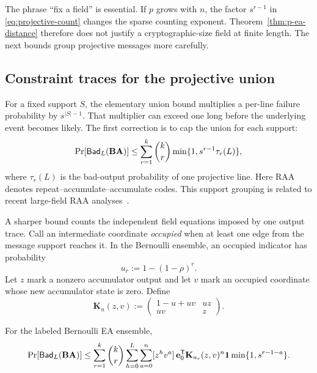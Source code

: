 The phrase ``fix a field'' is essential.  If $p$ grows with $n$, the factor
$s^{r-1}$ in \eqref{eq:projective-count} changes the sparse counting exponent.
Theorem~\ref{thm:p-ea-distance} therefore does not justify a cryptographic-size
field at finite length.  The next bounds group projective messages more
carefully.

\subsection{Constraint traces for the projective union}

For a fixed support $S$, the elementary union bound multiplies a per-line
failure probability by $s^{|S|-1}$.  That multiplier can exceed one long
before the underlying event becomes likely.  The first correction is to cap
the union for each support:
\begin{equation}
 \Pr[\mathsf{Bad}_L(\mathbf B\mathbf A)]
 \leq\sum_{r=1}^{k}\binom{k}{r}
 \min\{1,s^{r-1}\tau_r(L)\},
 \label{eq:support-grouping}
\end{equation}
where $\tau_r(L)$ is the bad-output probability of one projective line.
Here RAA denotes repeat--accumulate--accumulate codes.  This support grouping
is related to recent large-field RAA
analyses~\cite{AkhianiZhang2026,Khabbazian2026}.

A sharper bound counts the independent field equations imposed by one output
trace.  Call an intermediate coordinate \emph{occupied} when at least one
edge from the message support reaches it.  In the Bernoulli ensemble, an
occupied indicator has probability
\begin{equation}
 u_r:=1-(1-\rho)^r.
\end{equation}
Let $z$ mark a nonzero accumulator output and let $v$ mark an occupied
coordinate whose new accumulator state is zero.  Define
\begin{equation}
 \mathbf K_u(z,v):=
 \begin{pmatrix}1-u+uv&uz\\uv&z\end{pmatrix}.
 \label{eq:p-ea-trace-matrix}
\end{equation}

\begin{theorem}
\label{thm:p-ea-trace}
For the labeled Bernoulli EA ensemble,
\begin{equation}
 \Pr[\mathsf{Bad}_L(\mathbf B\mathbf A)]\leq
 \sum_{r=1}^{k}\binom{k}{r}
 \sum_{h=0}^{L}\sum_{a=0}^{n}
 [z^hv^a]\,
 \mathbf e_0^{\mathsf T}\mathbf K_{u_r}(z,v)^n\mathbf 1
 \min\{1,s^{r-1-a}\}.
 \label{eq:p-ea-trace-bound}
\end{equation}
\end{theorem}

